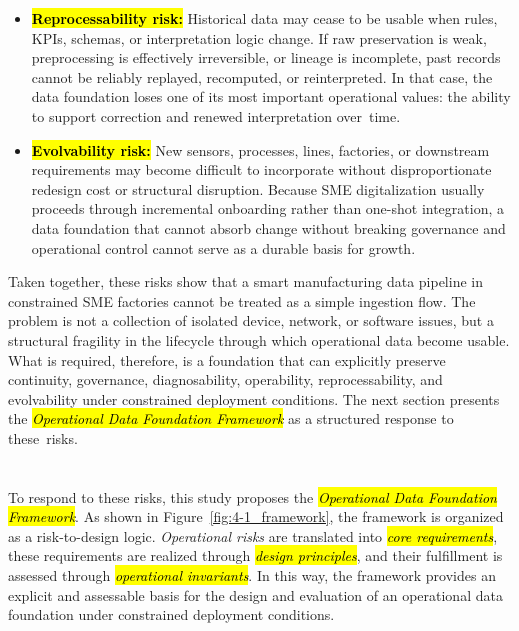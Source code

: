 \documentclass[systems,article,accept,pdftex,moreauthors]{Definitions/mdpi}
\begin{document}
\begin{itemize}[leftmargin=1.5em]
    \item[\textbf{\hl{RSK5.}}] \textbf{\hl{Reprocessability risk:}} Historical data may cease to be usable when rules, KPIs, schemas, or interpretation logic change. If raw preservation is weak, preprocessing is effectively irreversible, or lineage is incomplete, past records cannot be reliably replayed, recomputed, or reinterpreted. In that case, the data foundation loses one of its most important operational values: the ability to support correction and renewed interpretation \mbox{over time}.

    \item[\textbf{\hl{RSK6.}}] \textbf{\hl{Evolvability risk:}} New sensors, processes, lines, factories, or downstream requirements may become difficult to incorporate without disproportionate redesign cost or structural disruption. Because SME digitalization usually proceeds through incremental onboarding rather than one-shot integration, a data foundation that cannot absorb change without breaking governance and operational control cannot serve as a durable basis for growth.
\end{itemize}

Taken together, these risks show that a smart manufacturing data pipeline in constrained SME factories cannot be treated as a simple ingestion flow. The problem is not a collection of isolated device, network, or software issues, but a structural fragility in the lifecycle through which operational data become usable. What is required, therefore, is a foundation that can explicitly preserve continuity, governance, diagnosability, operability, reprocessability, and evolvability under constrained deployment conditions. The next section presents the \emph{\hl{Operational Data Foundation Framework}} as a structured response to \mbox{these risks}.

\section{ %
}
\label{sec:odff}

To respond to these risks, this study proposes the \emph{\hl{Operational Data Foundation Framework}}. As shown in Figure~\ref{fig:4-1_framework}, the framework is organized as a risk-to-design logic. \emph{Operational risks} are translated into \emph{\hl{core requirements}}, these requirements are realized through \emph{\hl{design principles}}, and their fulfillment is assessed through \emph{\hl{operational invariants}}. In this way, the framework provides an explicit and assessable basis for the design and evaluation of an operational data foundation under constrained deployment conditions.
\end{document}
